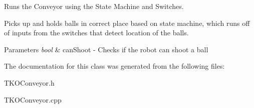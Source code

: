Runs the Conveyor using the State Machine and Switches. 

Picks up and holds balls in correct place based on state machine, which runs off of inputs from the switches that detect location of the balls. 
\begin{DoxyParams}{Parameters}
{\em bool} & can\-Shoot -\/ Checks if the robot can shoot a ball \\
\hline
\end{DoxyParams}


The documentation for this class was generated from the following files\-:\begin{DoxyCompactItemize}
\item 
T\-K\-O\-Conveyor.\-h\item 
T\-K\-O\-Conveyor.\-cpp\end{DoxyCompactItemize}
